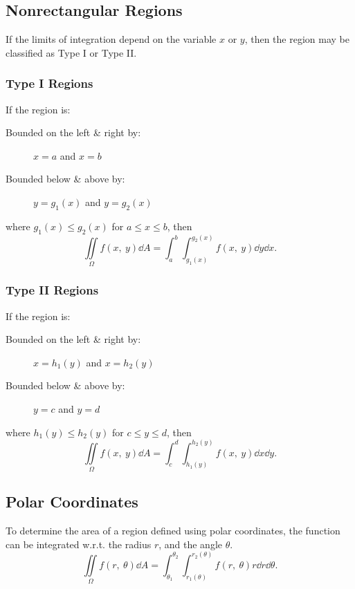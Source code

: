 \documentclass{article}
\begin{document}
\subsection{Nonrectangular Regions}
If the limits of integration depend on the variable $x$ or $y$, then the region 
may be classified as Type I or Type II.
\subsubsection{Type I Regions}
If the region is: 
\begin{description}
    \item[Bounded on the left \& right by:] $x=a$ and $x=b$
    \item[Bounded below \& above by:] $y=g_1(x)$ and $y=g_2(x)$
\end{description}
where $g_1(x) \leq g_2(x)$ for $a \leq x \leq b$, then
\begin{equation*}
    \iint\limits_{\Omega} f(x,\: y) \dd{A} = \int_a^b\int_{g_1(x)}^{g_2(x)} f(x,\: y) \dd{y} \dd{x}.
\end{equation*}
\subsubsection{Type II Regions}
If the region is: 
\begin{description}
    \item[Bounded on the left \& right by:] $x=h_1(y)$ and $x=h_2(y)$
    \item[Bounded below \& above by:] $y=c$ and $y=d$
\end{description}
where $h_1(y) \leq h_2(y)$ for $c \leq y \leq d$, then
\begin{equation*}
    \iint\limits_{\Omega} f(x,\: y) \dd{A} = \int_c^d\int_{h_1(y)}^{h_2(y)} f(x,\: y) \dd{x} \dd{y}.
\end{equation*}
\subsection{Polar Coordinates}
To determine the area of a region defined using polar coordinates, 
the function can be integrated w.r.t. the radius $r$, and the angle $\theta$.
\begin{equation*}
    \iint\limits_{\Omega} f(r,\: \theta) \dd{A} = \int_{\theta_1}^{\theta_2}\int_{r_1(\theta)}^{r_2(\theta)} f\left(r,\: \theta\right) r \dd{r} \dd{\theta}.
\end{equation*} 
\end{document}
